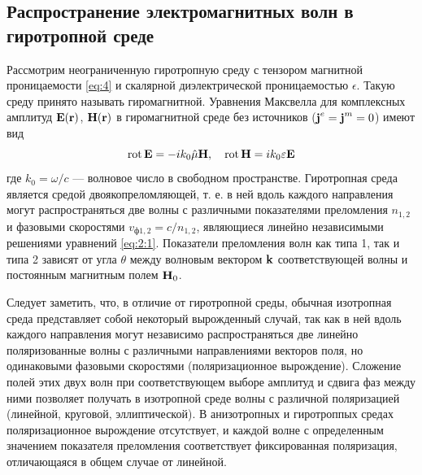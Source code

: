 \subsection{Распространение электромагнитных волн в гиротропной среде}
Рассмотрим неограниченную гиротропную среду с тензором магнитной проницаемости \eqref{eq:4} и скалярной диэлектрической
проницаемостью $\epsilon$. Такую среду принято называть гиромагнитной. Уравнения Максвелла для комплексных амплитуд
$\textbf{E}(\textbf{r})$, $\textbf{H}(\textbf{r})$ в гиромагнитной среде без источников ($\textbf{j}^e = \textbf{j}^m=0$) имеют вид
\begin{equation}
    \operatorname{rot} \textbf{E}=-i k_{0} \hat{\mu} \textbf{H}, \quad \operatorname{rot} \textbf{H}=i k_{0} \varepsilon \textbf{E}
    \label{eq:2:1}
\end{equation}
где $k_0 = \omega /c$ — волновое число в свободном пространстве. Гиротропная среда является средой двоякопреломляющей, т. е. в
ней вдоль каждого направления могут распространяться две волны с различными показателями преломления $n_{1,2}$ и фазовыми
скоростями $v_{\text{ф}1,2} = c/n_{1,2}$, являющиеся линейно независимыми решениями уравнений \eqref{eq:2:1}. Показатели преломления волн как
типа 1, так и типа 2 зависят от угла $\theta$ между волновым вектором $\textbf{k}$ соответствующей волны и постоянным магнитным полем $\textbf{H}_0$.

Следует заметить, что, в отличие от гиротропной среды, обычная изотропная среда представляет собой некоторый вырожденный
случай, так как в ней вдоль каждого направления могут независимо распространяться две линейно поляризованные волны с
различными направлениями векторов поля, но одинаковыми фазовыми скоростями (поляризационное вырождение).
Сложение полей этих двух волн при соответствующем выборе амплитуд и сдвига фаз между ними позволяет получать в
изотропной среде волны с различной поляризацией (линейной, круговой, эллиптической).
В анизотропных и гиротроппых средах поляризационное вырождение отсутствует, и каждой волне с определенным значением
показателя преломления соответствует фиксированная поляризация, отличающаяся в общем случае от линейной.

